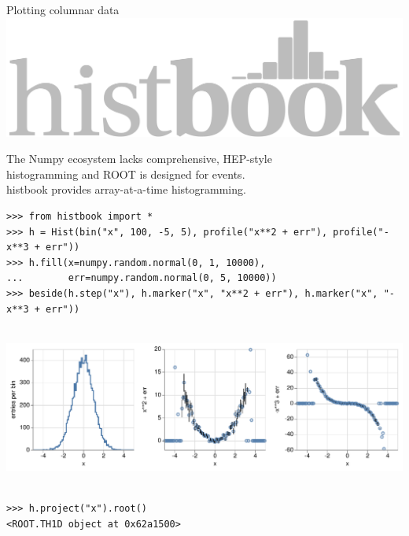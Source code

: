 \documentclass[aspectratio=169]{beamer}
\begin{document}
\begin{frame}[fragile]{Plotting columnar data}
\vspace{0.5 cm}
\hfill \includegraphics[height=1.5 cm]{histbook-logo.pdf}

\vspace{-1.7 cm}
The Numpy ecosystem lacks comprehensive, HEP-style \\
histogramming and ROOT is designed for events. \\
histbook provides array-at-a-time histogramming.

\vspace{0.25 cm}
\scriptsize
\begin{verbatim}
>>> from histbook import *
>>> h = Hist(bin("x", 100, -5, 5), profile("x**2 + err"), profile("-x**3 + err"))
>>> h.fill(x=numpy.random.normal(0, 1, 10000),
...        err=numpy.random.normal(0, 5, 10000))
>>> beside(h.step("x"), h.marker("x", "x**2 + err"), h.marker("x", "-x**3 + err"))
\end{verbatim}

\mbox{ } \hfill \includegraphics[width=0.7\linewidth]{histbook-example.pdf} \hfill \mbox{ }

\begin{verbatim}
>>> h.project("x").root()
<ROOT.TH1D object at 0x62a1500>
\end{verbatim}
\end{frame}
\end{document}
